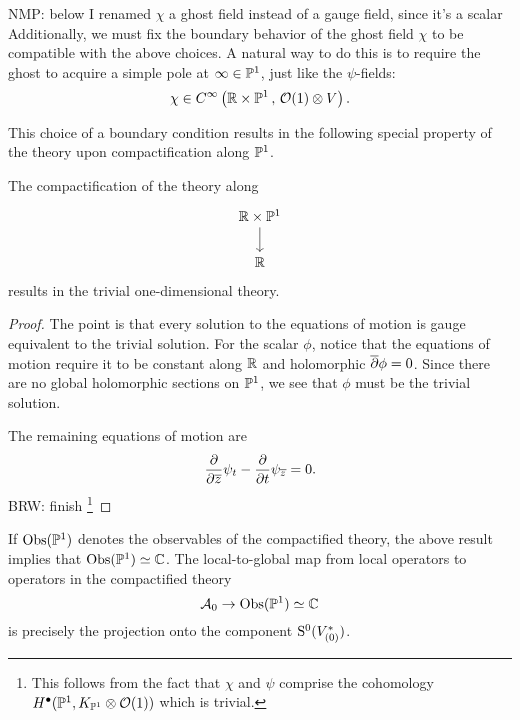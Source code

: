 \documentclass[11pt]{amsart}
\def\brian#1{{\textcolor{blue!65!red}{BRW: {#1}}}}
\def\natalie#1{{\textcolor{green!65!black}{NMP: {#1}}}}
\begin{document}
\natalie{below I renamed $\chi$ a ghost field instead of a gauge field, since it's a scalar}
Additionally, we must fix the boundary behavior of the ghost field $\chi$ to be compatible with the above choices.
A natural way to do this is to require the ghost to acquire a simple pole at $\infty \in \mathbb P^1$, just like the $\psi$-fields:
\[
\chi \in C^\infty\left(\mathbb R \times \mathbb P^1 \, , \, \mathcal O(1) \otimes V\right) .
\]

This choice of a boundary condition results in the following special property of the theory upon compactification along $\mathbb P^1$.

\begin{lem}\label{lem:compactP1}
The compactification of the theory along 
\[
\begin{tikzcd}
\RR \times \PP^1 \ar[d] \\ \RR
\end{tikzcd}
\]
results in the trivial one-dimensional theory. 
\end{lem}
\begin{proof}
The point is that every solution to the equations of motion is gauge equivalent to the trivial solution. 
For the scalar $\phi$, notice that the equations of motion require it to be constant along $\mathbb R$ and holomorphic $\overline{\partial} \phi = 0$. 
Since there are no global holomorphic sections on $\mathbb P^1$, we see that $\phi$ must be the trivial solution. 

The remaining equations of motion are
\[
\frac{\partial}{\partial {\overline{z}}} \psi_t - \frac{\partial}{\partial t} \psi_{\overline{z}} = 0 .
\]
\brian{finish} \footnote{This follows from the fact that $\chi$ and $\psi$ comprise the cohomology $H^\bullet(\mathbb P^1, K_{\mathbb P^1} \otimes \mathcal O(1))$ which is trivial.}

\end{proof}

If ${\rm Obs}(\mathbb P^1)$ denotes the observables of the compactified theory, the above result implies that ${\rm Obs}(\mathbb P^1) \simeq \mathbb C$. 
The local-to-global map from local operators to operators in the compactified theory
\[
\mathcal A_0 \to {\rm Obs}(\mathbb P^1) \simeq \mathbb C
\]
is precisely the projection onto the component ${\rm S}^0(V^*_{(0)})$. 

\end{document}
